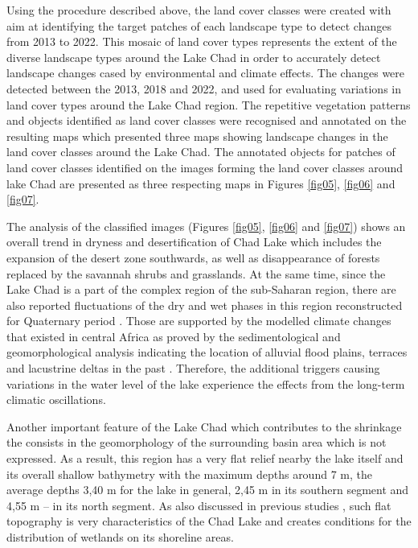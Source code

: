 \documentclass[geosciences,article,submit,pdftex,moreauthors]{Definitions/mdpi}
\begin{document}
Using the procedure described above, the land cover classes were created with aim at identifying the target patches of each landscape type to detect changes from 2013 to 2022. This mosaic of land cover types represents the extent of the diverse landscape types around the Lake Chad in order to accurately detect landscape changes cased by environmental and climate effects. The changes were detected between the 2013, 2018 and 2022, and used for evaluating variations in land cover types around the Lake Chad region. The repetitive vegetation patterns and objects identified as land cover classes were recognised and annotated on the resulting maps which presented three maps showing landscape changes in the land cover classes around the Lake Chad. The annotated objects for patches of land cover classes identified on the images forming the land cover classes around lake Chad are presented as three respecting maps in Figures \ref{fig05}, \ref{fig06} and \ref{fig07}. 

The analysis of the classified images (Figures \ref{fig05}, \ref{fig06} and \ref{fig07}) shows an overall trend in dryness and desertification of Chad Lake which includes the expansion of the desert zone southwards, as well as disappearance of forests replaced by the savannah shrubs and grasslands. At the same time, since the Lake Chad is a part of the complex region of the sub-Saharan region, there are also reported fluctuations of the dry and wet phases in this region reconstructed for Quaternary period \cite{Rognon}. Those are supported by the modelled climate changes that existed in central Africa as proved by the sedimentological and geomorphological analysis indicating the location of alluvial flood plains, terraces and lacustrine deltas in the past \cite{Servant1975}. Therefore, the additional triggers causing variations in the water level of the lake experience the effects from the long-term climatic oscillations.

Another important feature of the Lake Chad which contributes to the shrinkage the consists in the geomorphology of the surrounding basin area which is not expressed. As a result, this region has a very flat relief nearby the lake itself and its overall shallow bathymetry with the maximum depths around 7 m, the average depths 3,40 m for the lake in general, 2,45 m in its southern segment and 4,55 m -- in its north segment. As also discussed in previous studies \cite{Pedro}, such flat topography is very characteristics of the Chad Lake and creates conditions for the distribution of wetlands on its shoreline areas.
\end{document}
